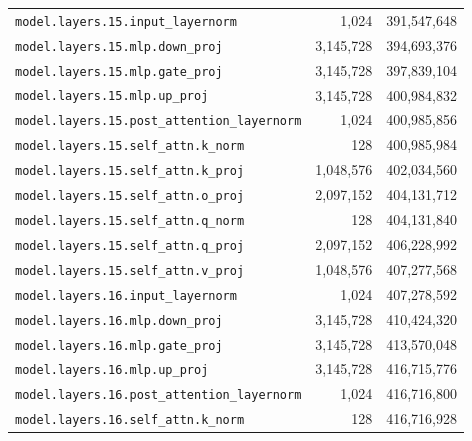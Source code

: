 \documentclass[10pt,a4paper]{article}
\theoremstyle{definition}
\begin{document}
\begin{appendices}
\begin{longtable}{p{9.5cm}rr}
\texttt{model.\allowbreak{}layers.\allowbreak{}15.\allowbreak{}input\_layernorm} & 1,024 & 391,547,648 \\
\texttt{model.\allowbreak{}layers.\allowbreak{}15.\allowbreak{}mlp.\allowbreak{}down\_proj} & 3,145,728 & 394,693,376 \\
\texttt{model.\allowbreak{}layers.\allowbreak{}15.\allowbreak{}mlp.\allowbreak{}gate\_proj} & 3,145,728 & 397,839,104 \\
\texttt{model.\allowbreak{}layers.\allowbreak{}15.\allowbreak{}mlp.\allowbreak{}up\_proj} & 3,145,728 & 400,984,832 \\
\texttt{model.\allowbreak{}layers.\allowbreak{}15.\allowbreak{}post\_attention\_layernorm} & 1,024 & 400,985,856 \\
\texttt{model.\allowbreak{}layers.\allowbreak{}15.\allowbreak{}self\_attn.\allowbreak{}k\_norm} & 128 & 400,985,984 \\
\texttt{model.\allowbreak{}layers.\allowbreak{}15.\allowbreak{}self\_attn.\allowbreak{}k\_proj} & 1,048,576 & 402,034,560 \\
\texttt{model.\allowbreak{}layers.\allowbreak{}15.\allowbreak{}self\_attn.\allowbreak{}o\_proj} & 2,097,152 & 404,131,712 \\
\texttt{model.\allowbreak{}layers.\allowbreak{}15.\allowbreak{}self\_attn.\allowbreak{}q\_norm} & 128 & 404,131,840 \\
\texttt{model.\allowbreak{}layers.\allowbreak{}15.\allowbreak{}self\_attn.\allowbreak{}q\_proj} & 2,097,152 & 406,228,992 \\
\texttt{model.\allowbreak{}layers.\allowbreak{}15.\allowbreak{}self\_attn.\allowbreak{}v\_proj} & 1,048,576 & 407,277,568 \\
\texttt{model.\allowbreak{}layers.\allowbreak{}16.\allowbreak{}input\_layernorm} & 1,024 & 407,278,592 \\
\texttt{model.\allowbreak{}layers.\allowbreak{}16.\allowbreak{}mlp.\allowbreak{}down\_proj} & 3,145,728 & 410,424,320 \\
\texttt{model.\allowbreak{}layers.\allowbreak{}16.\allowbreak{}mlp.\allowbreak{}gate\_proj} & 3,145,728 & 413,570,048 \\
\texttt{model.\allowbreak{}layers.\allowbreak{}16.\allowbreak{}mlp.\allowbreak{}up\_proj} & 3,145,728 & 416,715,776 \\
\texttt{model.\allowbreak{}layers.\allowbreak{}16.\allowbreak{}post\_attention\_layernorm} & 1,024 & 416,716,800 \\
\texttt{model.\allowbreak{}layers.\allowbreak{}16.\allowbreak{}self\_attn.\allowbreak{}k\_norm} & 128 & 416,716,928 \\

\end{longtable}
\end{appendices}
\end{document}
